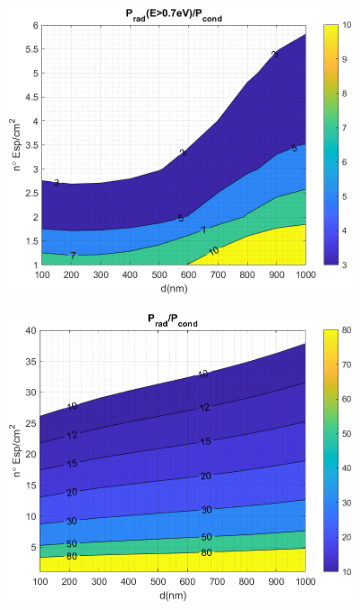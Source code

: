 \begin{figure}[H]
	\centering
	\begin{subfigure}[b]{0.49\textwidth}
		\centering
		\includegraphics[width=1.00\textwidth]{figuras/Resultados/RelacionCondRad/SiSi.png}
		\caption{ }
		\label{fig:rel_SiSiO2Si}
	\end{subfigure}
	\hfill
	\begin{subfigure}[b]{0.49\textwidth}
		\centering
		\includegraphics[width=1.00\textwidth]{figuras/Resultados/RelacionCondRad/SiSi_full.png}

\end{subfigure}
\end{figure}
